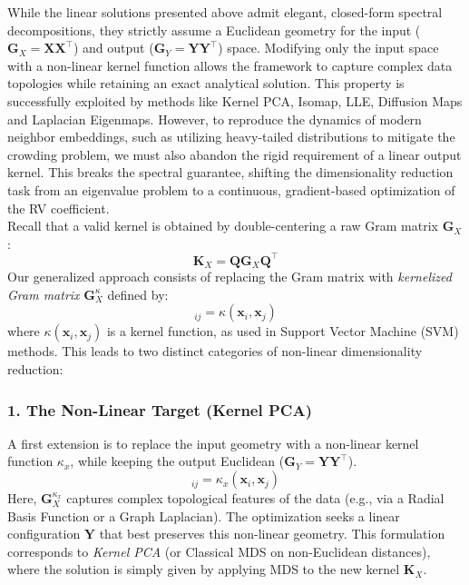 \documentclass[11pt]{article}
\begin{document}
	While the linear solutions presented above admit elegant, closed-form spectral decompositions, they strictly assume a Euclidean geometry for the input ($\mathbf{G}_X =\mathbf{X} \mathbf{X}^\top$) and output ($\mathbf{G}_Y =\mathbf{Y} \mathbf{Y}^\top$) space. Modifying only the input space with a non-linear kernel function allows the framework to capture complex data topologies while retaining an exact analytical solution. This property is successfully exploited by methods like Kernel PCA, Isomap, LLE, Diffusion Maps and Laplacian Eigenmaps. However, to reproduce the dynamics of modern neighbor embeddings, such as utilizing heavy-tailed distributions to mitigate the crowding problem, we must also abandon the rigid requirement of a linear output kernel. This breaks the spectral guarantee, shifting the dimensionality reduction task from an eigenvalue problem to a continuous, gradient-based optimization of the RV coefficient. \\
	
	\noindent Recall that a valid kernel is obtained by double-centering a raw Gram matrix $\mathbf{G}_X$:
	\begin{equation}
		\mathbf{K}_X = \mathbf{Q} \mathbf{G}_X \mathbf{Q}^\top
	\end{equation}
	Our generalized approach consists of replacing the Gram matrix with \emph{kernelized Gram matrix} $\mathbf{G}_X^\kappa$ defined by:
	\begin{equation}
		[\mathbf{G}_X^\kappa]_{ij} = \kappa(\mathbf{x}_i, \mathbf{x}_j)
	\end{equation}
	where $\kappa(\mathbf{x}_i, \mathbf{x}_j)$ is a kernel function, as used in Support Vector Machine (SVM) methods. This leads to two distinct categories of non-linear dimensionality reduction:
	
	\subsubsection*{1. The Non-Linear Target (Kernel PCA)}
	A first extension is to replace the input geometry with a non-linear kernel function $\kappa_x$, while keeping the output Euclidean ($\mathbf{G}_Y = \mathbf{Y}\mathbf{Y}^\top$).
	\begin{equation}
		[\mathbf{G}^{\kappa_x}_X]_{ij} = \kappa_x(\mathbf{x}_i, \mathbf{x}_j)
	\end{equation}
	Here, $\mathbf{G}^{\kappa_x}_X$ captures complex topological features of the data (e.g., via a Radial Basis Function or a Graph Laplacian). The optimization seeks a linear configuration $\mathbf{Y}$ that best preserves this non-linear geometry. This formulation corresponds to \emph{Kernel PCA} (or Classical MDS on non-Euclidean distances), where the solution is simply given by applying MDS to the new kernel $\mathbf{K}_X$.
	
\end{document}

